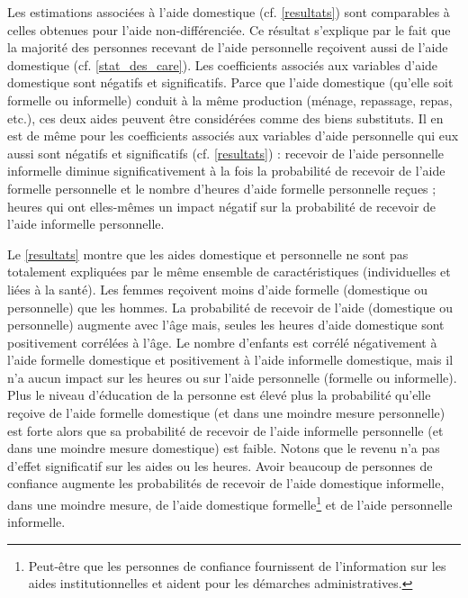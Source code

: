 \begin{Article}
\begin{refsection}[Bonnal]
Les estimations associées à l'aide domestique (cf. \autoref{resultats}) sont comparables à celles obtenues pour l'aide non-différenciée. Ce résultat s'explique par le fait que la majorité des personnes recevant de l'aide personnelle reçoivent aussi de l'aide domestique (cf. \autoref{stat_des_care}). Les coefficients associés aux variables d'aide domestique sont négatifs et significatifs. Parce que l'aide domestique (qu'elle soit formelle ou informelle) conduit à la même production (ménage, repassage, repas, etc.), ces deux aides peuvent être considérées comme des biens substituts. Il en est de même pour les coefficients associés aux variables d'aide personnelle qui eux aussi sont négatifs et significatifs (cf. \autoref{resultats}) : recevoir de l'aide personnelle informelle diminue significativement à la fois la probabilité de recevoir de l'aide formelle personnelle et le nombre d'heures d'aide formelle personnelle reçues ; heures qui ont elles-mêmes un impact négatif sur la probabilité de recevoir de l'aide informelle personnelle.

Le \autoref{resultats} montre que les aides domestique et personnelle ne sont pas totalement expliquées par le même ensemble de caractéristiques (individuelles et liées à la santé). Les femmes reçoivent moins d’aide formelle (domestique ou personnelle) que les hommes. La probabilité de recevoir de l’aide (domestique ou personnelle) augmente avec l’âge mais, seules les heures d’aide domestique sont positivement corrélées à l’âge. Le nombre d’enfants est corrélé négativement à l’aide formelle domestique et positivement à l’aide informelle domestique, mais il n'a aucun impact sur les heures ou sur l’aide personnelle (formelle ou informelle). Plus le niveau d’éducation de la personne est élevé plus la probabilité qu’elle reçoive de l’aide formelle domestique (et dans une moindre mesure personnelle) est forte alors que sa probabilité de recevoir de l’aide informelle personnelle (et dans une moindre mesure domestique) est faible. Notons que le revenu n’a pas d’effet significatif sur les aides ou les heures. Avoir beaucoup de personnes de confiance augmente les probabilités de recevoir de l’aide domestique informelle, dans une moindre mesure, de l'aide domestique formelle\footnote{Peut-être que les personnes de confiance fournissent de l'information sur les aides institutionnelles et aident pour les démarches administratives.} et de l'aide personnelle informelle.


\end{refsection}
\end{Article}
